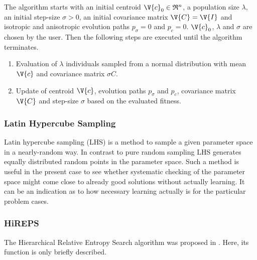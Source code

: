 The algorithm starts with an initial centroid $\V{c}_0 \in \mathfrak{R}^n$, a population size $\lambda$, an initial step-size $\sigma>0$, an initial covariance matrix $\V{C}=\V{I}$ and isotropic and anisotropic evolution paths $p_\sigma=0$ and $p_c=0$.
$\V{c}_0$, $\lambda$ and $\sigma$ are chosen by the user.
Then the following steps are executed until the algorithm terminates.
\begin{enumerate}
\item Evaluation of $\lambda$ individuals sampled from a normal distribution with mean $\V{c}$ and covariance matrix $\sigma C$.
\item Update of centroid $\V{c}$, evolution paths $p_\sigma$ and $p_c$, covariance matrix $\V{C}$ and step-size $\sigma$ based on the evaluated fitness.
\end{enumerate}

\subsubsection{Latin Hypercube Sampling}

Latin hypercube sampling (LHS) \cite{McKay.1979} is a method to sample a given parameter space in a nearly-random way.
In contrast to pure random sampling LHS generates equally distributed random points in the parameter space.
Such a method is useful in the present case to see whether systematic checking of the parameter space might come close to already good solutions without actually learning.
It can be an indication as to how necessary learning actually is for the particular problem cases.

\subsubsection{HiREPS}

The Hierarchical Relative Entropy Search algorithm was proposed in \cite{Daniel.2012}. Here, its function is only briefly described.

